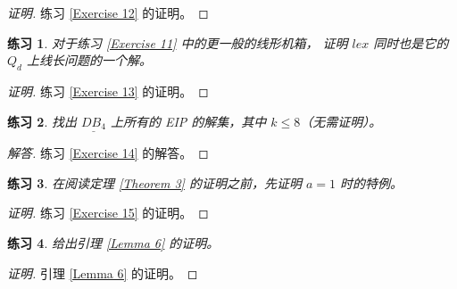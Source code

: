 \documentclass[12pt, a4paper]{article}
\newtheorem{exercisewithanswer}{练习}
\newenvironment{answer}[1][Answer]{
	\begin{proof}[#1]
	\let\qed\relax
}{
	\end{proof}
}
\begin{document}
\begin{proof}[证明]
练习 \ref{Exercise 12} 的证明。
\end{proof}

\begin{exercisewithanswer}
对于练习 \ref{Exercise 11} 中的更一般的线形机箱，
证明 $lex$ 同时也是它的 $Q_d$ 上线长问题的一个解。
\end{exercisewithanswer}

\begin{proof}[证明]
练习 \ref{Exercise 13} 的证明。
\end{proof}

\begin{exercisewithanswer}
找出 $\underline{DB_4}$ 上所有的 EIP 的解集，其中 $k \le 8$（无需证明）。
\end{exercisewithanswer}

\begin{answer}[解答]
练习 \ref{Exercise 14} 的解答。
\end{answer}

\begin{exercisewithanswer}
在阅读定理 \ref{Theorem 3} 的证明之前，先证明 $a = 1$ 时的特例。
\end{exercisewithanswer}

\begin{proof}[证明]
练习 \ref{Exercise 15} 的证明。
\end{proof}

\begin{exercisewithanswer}
给出引理 \ref{Lemma 6} 的证明。
\end{exercisewithanswer}

\begin{proof}[证明]
引理 \ref{Lemma 6} 的证明。
\end{proof}
\end{document}
